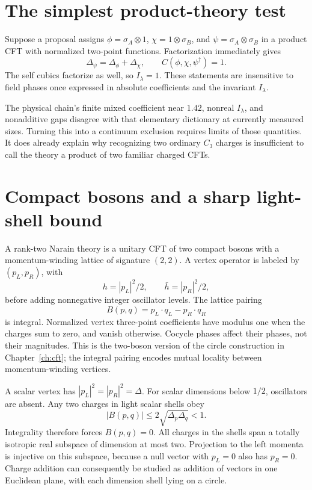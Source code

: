 \section{The simplest product-theory test}

Suppose a proposal assigns
$\phi=\sigma_A\otimes1$,
$\chi=1\otimes\sigma_B$, and
$\psi=\sigma_A\otimes\sigma_B$ in a product CFT with normalized
two-point functions. Factorization immediately gives
\[
 \Delta_\psi=\Delta_\phi+\Delta_\chi,\qquad
 C(\phi,\chi,\psi^\dagger)=1.
\]
The self cubics factorize as well, so $I_\lambda=1$.
These statements are insensitive to field phases once expressed in
absolute coefficients and the invariant $I_\lambda$.

The physical chain's finite mixed coefficient near $1.42$, nonreal
$I_\lambda$, and nonadditive gaps disagree with that elementary
dictionary at currently measured sizes. Turning this into a continuum
exclusion requires limits of those quantities. It does already explain
why recognizing two ordinary $C_3$ charges is insufficient to call the
theory a product of two familiar charged CFTs.

\section{Compact bosons and a sharp light-shell bound}

A rank-two Narain theory is a unitary CFT of two compact bosons with a
momentum-winding lattice of signature $(2,2)$. A vertex operator is
labeled by $(p_L,p_R)$, with
\[
 h=|p_L|^2/2,
 \qquad\bar h=|p_R|^2/2,
\]
before adding nonnegative integer oscillator levels. The lattice pairing
\[
 B(p,q)=p_L\cdot q_L-p_R\cdot q_R
\]
is integral. Normalized vertex three-point coefficients have modulus one
when the charges sum to zero, and vanish otherwise. Cocycle phases affect
their phases, not their magnitudes.
This is the two-boson version of the circle construction in
Chapter~\ref{ch:cft}; the integral pairing encodes mutual locality
between momentum-winding vertices.

A scalar vertex has $|p_L|^2=|p_R|^2=\Delta$. For scalar dimensions below
$1/2$, oscillators are absent. Any two charges in light scalar shells obey
\[
 |B(p,q)|\leq2\sqrt{\Delta_p\Delta_q}<1.
\]
Integrality therefore forces $B(p,q)=0$. All charges in the shells span a
totally isotropic real subspace of dimension at most two. Projection to
the left momenta is injective on this subspace, because a null vector
with $p_L=0$ also has $p_R=0$. Charge addition can consequently be studied
as addition of vectors in one Euclidean plane, with each dimension shell
lying on a circle.

